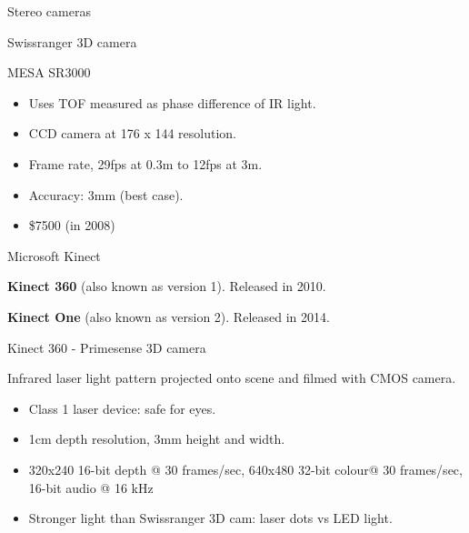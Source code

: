 \documentclass[compress]{beamer}
\begin{document}
\begin{frame}{Stereo cameras}
{}
\end{frame}

\begin{frame}{Swissranger 3D camera}

MESA SR3000

\begin{itemize}

\item
  Uses TOF measured as phase difference of IR light.
\item
  CCD camera at 176 x 144 resolution.
\item
  Frame rate, 29fps at 0.3m to 12fps at 3m.
\item
  Accuracy: 3mm (best case).
\item
  \$7500 (in 2008)
\end{itemize}

\end{frame}

\begin{frame}{Microsoft Kinect}

\textbf{Kinect 360} (also known as version 1). Released in 2010.

\textbf{Kinect One} (also known as version 2). Released in 2014.

\end{frame}

\begin{frame}{Kinect 360 - Primesense 3D camera}

Infrared laser light pattern projected onto scene and filmed with CMOS
camera.

\begin{itemize}

\item
  Class 1 laser device: safe for eyes.
\item
  1cm depth resolution, 3mm height and width.
\item
  320x240 16-bit depth @ 30 frames/sec, 640x480 32-bit colour@ 30
  frames/sec, 16-bit audio @ 16 kHz
\item
  Stronger light than Swissranger 3D cam: laser dots vs LED light.
\end{itemize}

\end{frame}
\end{document}
